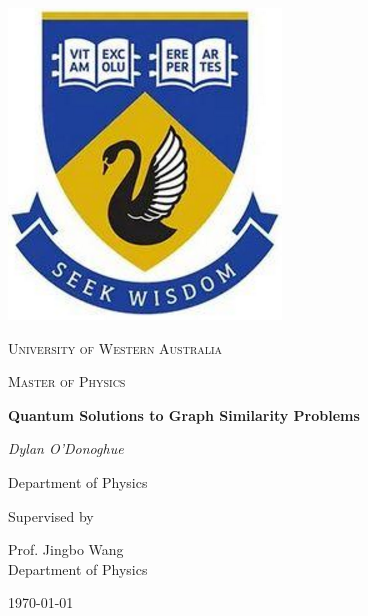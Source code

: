 \begin{titlepage}


\thispagestyle{empty}
\setlength\headheight{0pt} 
\begin{center}

\begin{center}
\includegraphics[width=0.25\linewidth]{Figs/uwa.PNG}            
\end{center}	

        \vspace{0.25cm}
        {\scshape\LARGE University of Western Australia \par}
        \vspace{0.25cm}
        {\scshape\Large Master of Physics \par}
        \vspace{0.5cm}

        {\Large\bfseries Quantum Solutions to Graph Similarity Problems\par}
        
        \vspace{0.5cm}
        {\Large\itshape Dylan O'Donoghue\par}
        Department of Physics
        \vspace{0.25cm}

\vspace{1cm}
Supervised by\par
Prof. Jingbo Wang \\
Department of Physics\par
\vspace{1.5cm}
\large
\today

\end{center}

\clearpage
\restoregeometry
\end{titlepage}
